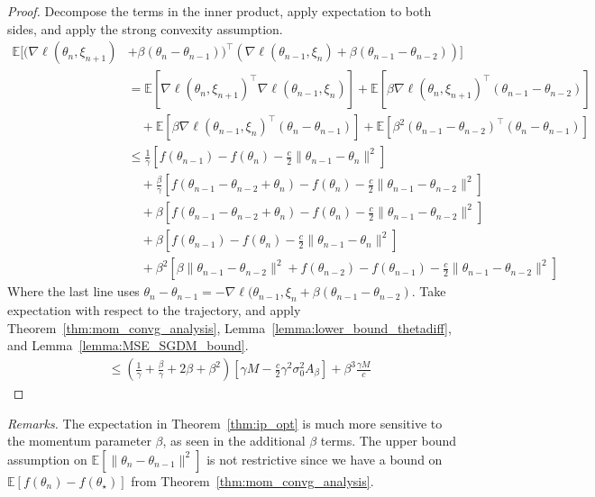 \documentclass[conference]{IEEEtran}
\newcommand{\Ex}[1]{\mathbb{E}[ #1 ]}
\begin{document}
\begin{proof}
Decompose the terms in the inner product, apply expectation to both sides, and apply the strong convexity assumption.
\begin{align*}
\Ex{ ( \nabla \ell ( \theta_n, \xi_{n+1}) &+ \beta ( \theta_n - \theta_{n-1} ) )^\top ( \nabla \ell ( \theta_{n-1}, \xi_{n} ) + \beta ( \theta_{n-1} - \theta_{n-2} ) ) } \\
&= \Ex{\nabla \ell ( \theta_n, \xi_{n+1} )^\top \nabla \ell ( \theta_{n-1}, \xi_n )}
+ \Ex{\beta \nabla \ell ( \theta_n, \xi_{n+1} )^\top ( \theta_{n-1} - \theta_{n-2} )} \\
&\quad + \Ex{\beta \nabla \ell ( \theta_{n-1}, \xi_n )^\top ( \theta_n - \theta_{n-1} )}
+ \Ex{\beta^2 ( \theta_{n-1} - \theta_{n-2} )^\top ( \theta_{n} - \theta_{n-1} )} \\
&\leq
\frac{1}{\gamma} \left[ f( \theta_{n-1} ) - f( \theta_n ) - \frac{c}{2} \| \theta_{n-1} - \theta_n \|^2 \right] \\
&\quad + \frac{\beta}{\gamma} \left[ f( \theta_{n-1} - \theta_{n-2} + \theta_n ) - f( \theta_n ) - \frac{c}{2} \| \theta_{n-1} - \theta_{n-2} \|^2 \right] \\
&\quad + \beta \left[ f( \theta_{n-1} - \theta_{n-2} + \theta_n ) - f( \theta_n ) - \frac{c}{2} \| \theta_{n-1} - \theta_{n-2} \|^2 \right] \\
&\quad + \beta \left[ f( \theta_{n-1} ) - f( \theta_n ) - \frac{c}{2} \| \theta_{n-1} - \theta_n \|^2 \right] \\
&\quad + \beta^2 \left[ \beta \| \theta_{n-1} - \theta_{n-2} \|^2 + f( \theta_{n-2} ) - f( \theta_{n-1} ) - \frac{c}{2} \| \theta_{n-1} - \theta_{n-2} \|^2 \right]
\end{align*}
Where the last line uses $\theta_n - \theta_{n-1} = - \nabla \ell (\theta_{n-1}, \xi_{n} + \beta (\theta_{n-1} - \theta_{n-2} )$.
Take expectation with respect to the trajectory, and apply Theorem~\ref{thm:mom_convg_analysis}, 
Lemma~\ref{lemma:lower_bound_thetadiff}, and Lemma~\ref{lemma:MSE_SGDM_bound}.
\begin{align*}
&\leq \left( \frac{1}{\gamma} + \frac{\beta}{\gamma} + 2 \beta + \beta^2 \right) \left[ \gamma M - \frac{c}{2} \gamma^2 \sigma_0^2 A_\beta \right]
+ \beta^3\frac{\gamma M}{c}
\end{align*}
\end{proof}
\emph{Remarks.}
The expectation in Theorem~\ref{thm:ip_opt} is much more sensitive to the momentum parameter $\beta$, as seen in the additional $\beta$ terms.
The upper bound assumption on $\Ex{\| \theta_n - \theta_{n-1} \|^2}$ is not restrictive since we have a bound on $\Ex{f(\theta_n)-f(\theta_\star)}$ from Theorem~\ref{thm:mom_convg_analysis}.
\end{document}
